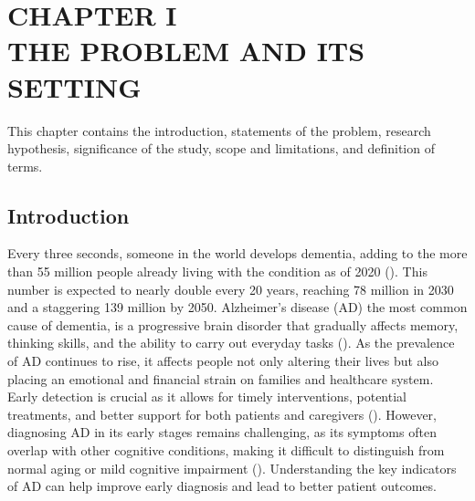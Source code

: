 \documentclass[12pt]{article}
\begin{document}
\renewcommand{\contentsname}{TABLE OF CONTENTS}
\doublespacing
\tableofcontents

\restoregeometry

\setcounter{page}{1}

\newpage

\section{CHAPTER I \\ THE PROBLEM AND ITS SETTING}
\doublespacing
\noindent

This chapter contains the introduction, statements of the problem, research hypothesis, 
significance of the study, scope and limitations, and definition of terms. 

\subsection{Introduction}
\noindent

Every three seconds, someone in the world develops dementia, adding to the more than 55 million people already 
living with the condition as of 2020 (\cite{alzint_dementia_statistics}). This number is expected to nearly double 
every 20 years, reaching 78 million in 2030 and a staggering 139 million by 2050. Alzheimer's disease (AD) the most
common cause of dementia, is a progressive brain disorder that gradually affects memory, thinking skills, and the ability
to carry out everyday tasks (\cite{AlzheimersAssociation2021}). As the prevalence of AD continues to rise, it affects people not only altering their lives 
but also placing an emotional and financial strain on families and healthcare system. Early detection is crucial as it allows for 
timely interventions, potential treatments, and better support for both patients and caregivers (\cite{Dubois2016}). However, diagnosing AD in its early stages remains challenging, 
as its symptoms often overlap with other cognitive conditions, making it difficult to distinguish from normal aging or mild cognitive impairment (\cite{Jack2018}). Understanding the key
indicators of AD can help improve early diagnosis and lead to better patient outcomes.
\end{document}
